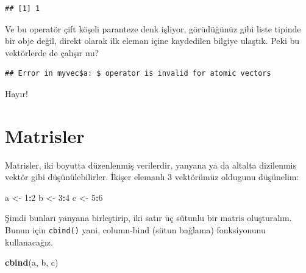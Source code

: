\documentclass[]{book}
\newenvironment{Shaded}{\begin{snugshade}}{\end{snugshade}}
\newcommand{\DecValTok}[1]{\textcolor[rgb]{0.00,0.00,0.81}{#1}}
\newcommand{\KeywordTok}[1]{\textcolor[rgb]{0.13,0.29,0.53}{\textbf{#1}}}
\newcommand{\NormalTok}[1]{#1}
\newcommand{\OperatorTok}[1]{\textcolor[rgb]{0.81,0.36,0.00}{\textbf{#1}}}
\newcommand{\StringTok}[1]{\textcolor[rgb]{0.31,0.60,0.02}{#1}}
\begin{document}
\begin{Shaded}
\end{Shaded}

\begin{verbatim}
## [1] 1
\end{verbatim}

Ve bu operatör çift köşeli paranteze denk işliyor, görüdüğünüz gibi
liste tipinde bir obje değil, direkt olarak ilk eleman içine kaydedilen
bilgiye ulaştık. Peki bu vektörlerde de çalışır mı?

\begin{Shaded}
\end{Shaded}

\begin{verbatim}
## Error in myvec$a: $ operator is invalid for atomic vectors
\end{verbatim}

Hayır!

\hypertarget{matrisler}{%
\chapter{Matrisler}\label{matrisler}}

Matrisler, iki boyutta düzenlenmiş verilerdir, yanyana ya da altalta
dizilenmis vektör gibi düşünülebilirler. İkişer elemanlı 3 vektörümüz
oldugunu düşünelim:

\begin{Shaded}
\begin{Highlighting}[]
\NormalTok{a <-}\StringTok{ }\DecValTok{1}\OperatorTok{:}\DecValTok{2}
\NormalTok{b <-}\StringTok{ }\DecValTok{3}\OperatorTok{:}\DecValTok{4}
\NormalTok{c <-}\StringTok{ }\DecValTok{5}\OperatorTok{:}\DecValTok{6}
\end{Highlighting}
\end{Shaded}

Şimdi bunları yanyana birleştirip, iki satır üç sütunlu bir matris
oluşturalım. Bunun için \texttt{cbind()} yani, column-bind (sütun
bağlama) fonksiyonunu kullanacağız.

\begin{Shaded}
\begin{Highlighting}[]
\KeywordTok{cbind}\NormalTok{(a, b, c)}
\end{Highlighting}
\end{Shaded}
\end{document}
